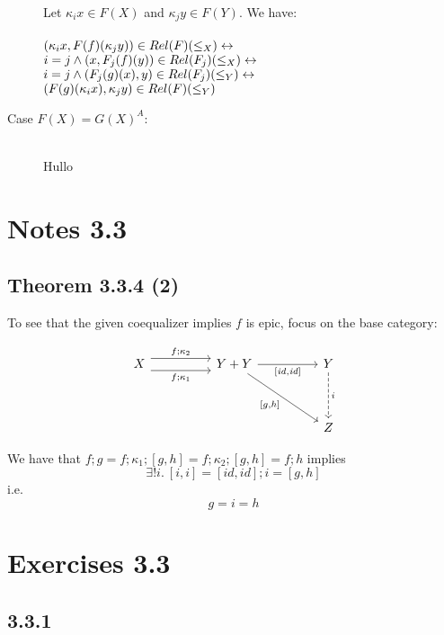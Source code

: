 \documentclass{article}
\begin{document}
\begin{description}
Let $\kappa_ix \in F(X)$ and $\kappa_jy \in F(Y)$.
We have:\\~\\
$(\kappa_ix, F(f)(\kappa_jy)) \in \mit{Rel}(F)(\leq_X) \leftrightarrow$\\
$i = j \wedge (x,F_j(f)(y)) \in \mit{Rel}(F_j)(\leq_X) \leftrightarrow$\\
$i = j \wedge (F_j(g)(x),y) \in \mit{Rel}(F_j)(\leq_Y) \leftrightarrow$\\
$(F(g)(\kappa_ix), \kappa_jy) \in \mit{Rel}(F)(\leq_Y)$\\

\item[Case $F(X) = G(X)^A$:]~\\

Hullo


\end{description}

\section*{Notes 3.3}

\subsection*{Theorem 3.3.4 (2)}

To see that the given coequalizer implies $f$ is epic, focus on the base category:

\[\begin{tikzcd}
	X && {Y + Y} && Y \\
	\\
	&&&& Z
	\arrow["{f;\kappa_2}", shift left=2, from=1-1, to=1-3]
	\arrow["{f;\kappa_1}"', shift right=2, from=1-1, to=1-3]
	\arrow["{[\mathit{id}, \mathit{id}]}"', from=1-3, to=1-5]
	\arrow["{[g,h]}"', from=1-3, to=3-5]
	\arrow["i", dashed, from=1-5, to=3-5]
\end{tikzcd}\]

We have that $f;g = f;\kappa_1;[g,h] = f;\kappa_2;[g,h] = f;h$ implies $$\exists ! i.~[i, i] = [\mathit{id},\mathit{id}];i = [g,h]$$ i.e. $$g = i = h$$


\section*{Exercises 3.3}

\subsection*{3.3.1}
\end{document}
